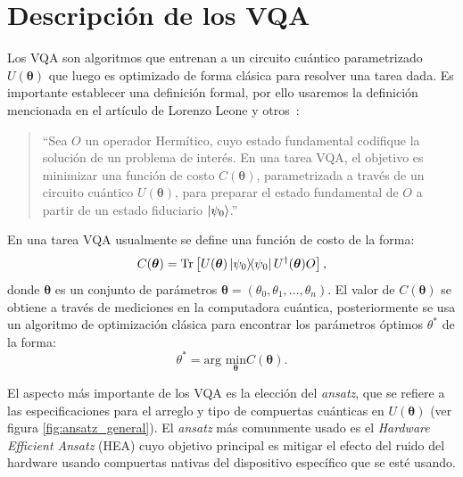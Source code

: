 \documentclass[letterpaper,12pt]{thesisECFM}
\theoremstyle{plain}
\theoremstyle{definition}
\theoremstyle{definition}
\theoremstyle{remark}
\newcommand{\1}{\mathbb{1}}
\begin{document}
\section{Descripción de los VQA} \label{sec:desc_vqa} %
Los VQA son algoritmos que entrenan a un circuito cuántico parametrizado
$U(\bm{\theta})$ que luego es optimizado de forma clásica para resolver una
tarea dada. Es importante establecer una definición formal, por ello usaremos
la definición mencionada en el artículo de Lorenzo Leone y otros~\cite{HEA}:
\begin{quote}
\enquote{Sea $O$ un operador Hermítico, cuyo estado fundamental codifique la solución de un problema de interés. En una tarea VQA, el objetivo es minimizar una función de costo $C(\bm{\theta})$, parametrizada a través de un circuito cuántico $U(\bm{\theta})$, para preparar el estado fundamental de $O$ a partir de un estado fiduciario $\ket{\psi_0}$.}
\end{quote}
En una tarea VQA usualmente se define una función de costo de la forma:
\begin{equation}
    C(\bm{\theta}) =  \text{Tr} \left[U(\bm{\theta}) \ketbra{\psi_0}{\psi_0} U^{\dagger}(\bm{\theta}) O \right],
\end{equation}
donde $\bm{\theta}$ es un conjunto de parámetros $ \bm{\theta}= (\theta_0,\theta_1,...,\theta_n)$. 
El valor de $C(\bm{\theta})$ se obtiene a través de mediciones en la computadora cuántica, posteriormente se usa un algoritmo de optimización clásica para encontrar los parámetros óptimos $\theta^*$ de la forma:
\begin{equation}
\theta^* = \text{arg }\underset{\bm{\theta}} {\text{min}} C (\bm{\theta}).
\end{equation}

El aspecto más importante de los VQA es la elección del \textit{ansatz}, que se refiere a las especificaciones para el arreglo y tipo de compuertas cuánticas en $U(\bm{\theta})$ (ver figura \ref{fig:ansatz_general}). El \textit{ansatz} más comunmente usado es el \textit{Hardware Efficient Ansatz} (HEA) cuyo objetivo principal es mitigar el efecto del ruido del hardware usando compuertas nativas del dispositivo específico que se esté usando.
\end{document}
